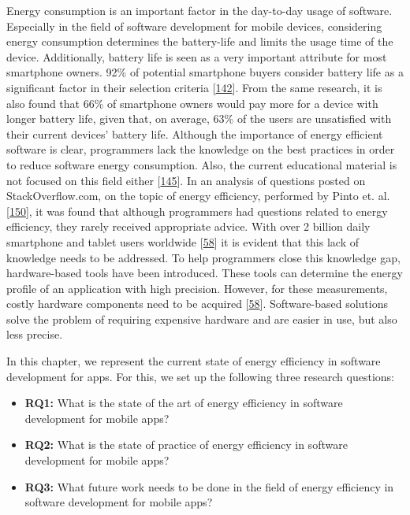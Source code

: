 \documentclass[]{book}
\providecommand{\tightlist}{%
  \setlength{\itemsep}{0pt}\setlength{\parskip}{0pt}}
\begin{document}
Energy consumption is an important factor in the day-to-day usage of
software. Especially in the field of software development for mobile
devices, considering energy consumption determines the battery-life and
limits the usage time of the device. Additionally, battery life is seen
as a very important attribute for most smartphone owners. 92\% of
potential smartphone buyers consider battery life as a significant
factor in their selection criteria
{[}\protect\hyperlink{ref-OOC2017}{142}{]}. From the same research, it
is also found that 66\% of smartphone owners would pay more for a device
with longer battery life, given that, on average, 63\% of the users are
unsatisfied with their current devices' battery life. Although the
importance of energy efficient software is clear, programmers lack the
knowledge on the best practices in order to reduce software energy
consumption. Also, the current educational material is not focused on
this field either {[}\protect\hyperlink{ref-PHA2016}{145}{]}. In an
analysis of questions posted on StackOverflow.com, on the topic of
energy efficiency, performed by Pinto et. al.
{[}\protect\hyperlink{ref-PCL2014}{150}{]}, it was found that although
programmers had questions related to energy efficiency, they rarely
received appropriate advice. With over 2 billion daily smartphone and
tablet users worldwide {[}\protect\hyperlink{ref-NPPPZL2017}{58}{]} it
is evident that this lack of knowledge needs to be addressed. To help
programmers close this knowledge gap, hardware-based tools have been
introduced. These tools can determine the energy profile of an
application with high precision. However, for these measurements, costly
hardware components need to be acquired
{[}\protect\hyperlink{ref-NPPPZL2017}{58}{]}. Software-based solutions
solve the problem of requiring expensive hardware and are easier in use,
but also less precise.

In this chapter, we represent the current state of energy efficiency in
software development for apps. For this, we set up the following three
research questions:

\begin{itemize}
\tightlist
\item
  \textbf{RQ1:} What is the state of the art of energy efficiency in
  software development for mobile apps?
\item
  \textbf{RQ2:} What is the state of practice of energy efficiency in
  software development for mobile apps?
\item
  \textbf{RQ3:} What future work needs to be done in the field of energy
  efficiency in software development for mobile apps?
\end{itemize}
\end{document}
